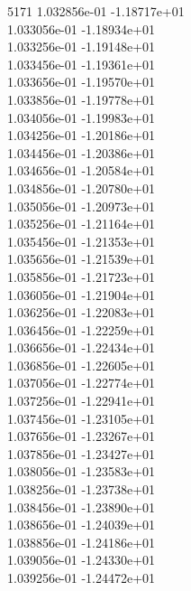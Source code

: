 5171	1.032856e-01	-1.18717e+01	\\ 	1.033056e-01	-1.18934e+01	\\ 	1.033256e-01	-1.19148e+01	\\ 	1.033456e-01	-1.19361e+01	\\ 	1.033656e-01	-1.19570e+01	\\ 	1.033856e-01	-1.19778e+01	\\ 	1.034056e-01	-1.19983e+01	\\ 	1.034256e-01	-1.20186e+01	\\ 	1.034456e-01	-1.20386e+01	\\ 	1.034656e-01	-1.20584e+01	\\ 	1.034856e-01	-1.20780e+01	\\ 	1.035056e-01	-1.20973e+01	\\ 	1.035256e-01	-1.21164e+01	\\ 	1.035456e-01	-1.21353e+01	\\ 	1.035656e-01	-1.21539e+01	\\ 	1.035856e-01	-1.21723e+01	\\ 	1.036056e-01	-1.21904e+01	\\ 	1.036256e-01	-1.22083e+01	\\ 	1.036456e-01	-1.22259e+01	\\ 	1.036656e-01	-1.22434e+01	\\ 	1.036856e-01	-1.22605e+01	\\ 	1.037056e-01	-1.22774e+01	\\ 	1.037256e-01	-1.22941e+01	\\ 	1.037456e-01	-1.23105e+01	\\ 	1.037656e-01	-1.23267e+01	\\ 	1.037856e-01	-1.23427e+01	\\ 	1.038056e-01	-1.23583e+01	\\ 	1.038256e-01	-1.23738e+01	\\ 	1.038456e-01	-1.23890e+01	\\ 	1.038656e-01	-1.24039e+01	\\ 	1.038856e-01	-1.24186e+01	\\ 	1.039056e-01	-1.24330e+01	\\ 	1.039256e-01	-1.24472e+01	\\ \hline
